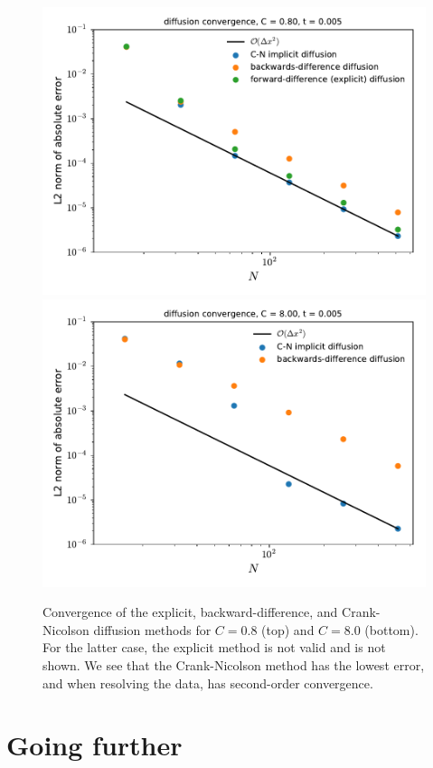 \begin{figure}
\centering
\includegraphics[width=0.75\linewidth]{diffimplicit-converge-0_8} \\
\includegraphics[width=0.75\linewidth]{diffimplicit-converge-8_0} 
\caption[Convergence of diffusion methods]
{\label{fig:diff:convergence} Convergence of the explicit, backward-difference,
and Crank-Nicolson diffusion methods for $C = 0.8$ (top) and $C = 8.0$ (bottom).
For the latter case, the explicit method is not valid and is not shown.
We see that the Crank-Nicolson method has the lowest error, and when resolving
the data, has second-order convergence.\\
}
\end{figure}

\section{Going further}

